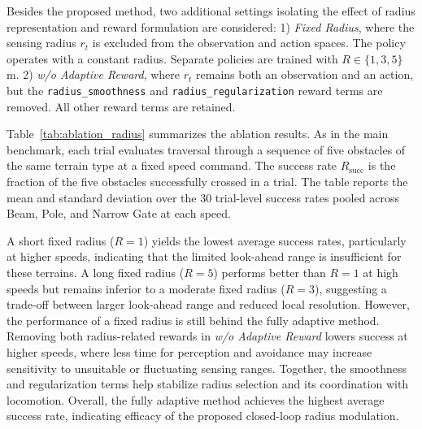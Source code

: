 Besides the proposed method, two additional settings isolating the effect of radius representation and reward formulation are considered:
1) \textit{Fixed Radius}, where the sensing radius $r_t$ is excluded from the observation and action spaces. The policy operates with a constant radius. Separate policies are trained with $R \in \{1, 3, 5\}$\,m.
2) \textit{w/o Adaptive Reward}, where $r_t$ remains both an observation and an action, but the \texttt{radius\_smoothness} and \texttt{radius\_regularization} reward terms are removed. All other reward terms are retained.

Table~\ref{tab:ablation_radius} summarizes the ablation results. As in the main benchmark, each trial evaluates traversal through a sequence of five obstacles of the same terrain type at a fixed speed command. The success rate $R_{\mathrm{succ}}$ is the fraction of the five obstacles successfully crossed in a trial. The table reports the mean and standard deviation over the 30 trial-level success rates pooled across Beam, Pole, and Narrow Gate at each speed.

A short fixed radius ($R=1$) yields the lowest average success rates, particularly at higher speeds, indicating that the limited look-ahead range is insufficient for these terrains. 
A long fixed radius ($R=5$) performs better than $R=1$ at high speeds but remains inferior to a moderate fixed radius ($R=3$), suggesting a trade-off between larger look-ahead range and reduced local resolution. However, the performance of a fixed radius is still behind the fully adaptive method. Removing both radius-related rewards in \textit{w/o Adaptive Reward} lowers success at higher speeds, where less time for perception and avoidance may increase sensitivity to unsuitable or fluctuating sensing ranges. Together, the smoothness and regularization terms help stabilize radius selection and its coordination with locomotion.
Overall, the fully adaptive method achieves the highest average success rate, indicating efficacy of the proposed closed-loop radius modulation.

